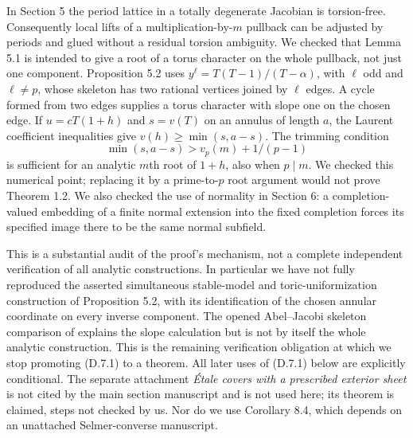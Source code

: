 In Section 5 the period lattice in a totally degenerate Jacobian is torsion-free.
Consequently local lifts of a multiplication-by-$m$ pullback can be adjusted
by periods and glued without a residual torsion ambiguity.  We checked that
Lemma 5.1 is intended to give a root of a torus character on the whole pullback,
not just one component.  Proposition 5.2 uses
$y^\ell=T(T-1)/(T-\alpha)$, with $\ell$ odd and $\ell\ne p$,
whose skeleton has two rational vertices joined by $\ell$ edges.
A cycle formed from two edges supplies a torus character with slope one on
the chosen edge.  If $u=cT(1+h)$ and $s=v(T)$ on an annulus of length $a$,
the Laurent coefficient inequalities give
$v(h)\geq\min(s,a-s)$.  The trimming condition
\[
 \min(s,a-s)>v_p(m)+1/(p-1)
\]
is sufficient for an analytic $m$th root of $1+h$, also when $p\mid m$.
We checked this numerical point; replacing it by a prime-to-$p$ root argument
would not prove Theorem 1.2.  We also checked the use of normality in Section 6:
a completion-valued embedding of a finite normal extension into the fixed
completion forces its specified image there to be the same normal subfield.

This is a substantial audit of the proof's mechanism, not a complete independent
verification of all analytic constructions.  In particular we have not fully
reproduced the asserted simultaneous stable-model and toric-uniformization
construction of Proposition 5.2, with its identification of the chosen
annular coordinate on every inverse component.  The opened Abel--Jacobi
skeleton comparison of \citet[Proposition 6.1 and Corollary 6.6]{BakerRabinoff2015}
explains the slope calculation but is not by itself the whole analytic
construction.  This is the remaining verification obligation at which we
stop promoting (D.7.1) to a theorem.  All later uses of (D.7.1) below are
explicitly conditional.  The separate attachment
\emph{\'Etale covers with a prescribed exterior sheet} is not cited by the
main section manuscript and is not used here; its theorem is claimed,
steps not checked by us.  Nor do we use Corollary 8.4, which depends on an
unattached Selmer-converse manuscript.

